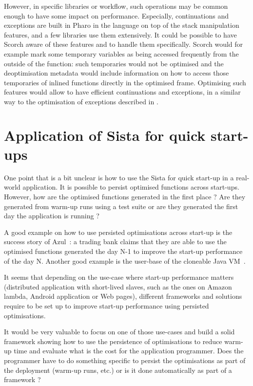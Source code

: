 \documentclass[a4paper,12pt,twoside]{../includes/ThesisStyle}
\begin{document}
However, in specific libraries or workflow, such operations may be common enough to have some impact on performance. Especially, continuations and exceptions are built in Pharo in the language on top of the stack manipulation features, and a few libraries use them extensively. It could be possible to have Scorch aware of these features and to handle them specifically. Scorch would for example mark some temporary variables as being accessed frequently from the outside of the function: such temporaries would not be optimised and the deoptimisation metadata would include information on how to access those temporaries of inlined functions directly in the optimised frame. Optimising such features would allow to have efficient continuations and exceptions, in a similar way to the optimisation of exceptions described in \cite{Ogas01a}. 

\section{Application of Sista for quick start-ups}
\label{sec:useCase}

One point that is a bit unclear is how to use the Sista for quick start-up in a real-world application. It is possible to persist optimised functions across start-ups. However, how are the optimised functions generated in the first place ? Are they generated from warm-up runs using a test suite or are they generated the first day the application is running ?

A good example on how to use persisted optimisations across start-up is the success story of Azul~\cite{Azul}: a trading bank claims that they are able to use the optimised functions generated the day N-1 to improve the start-up performance of the day N. Another good example is the user-base of the cloneable Java VM~\cite{Kawa07a}.

It seems that depending on the use-case where start-up performance matters (distributed application with short-lived slaves, such as the ones on Amazon lambda, Android application or Web pages), different frameworks and solutions require to be set up to improve start-up performance using persisted optimisations. 

It would be very valuable to focus on one of those use-cases and build a solid framework showing how to use the persistence of optimisations to reduce warm-up time and evaluate what is the cost for the application programmer. Does the programmer have to do something specific to persist the optimisations as part of the deployment (warm-up runs, etc.) or is it done automatically as part of a framework ?
\end{document}
